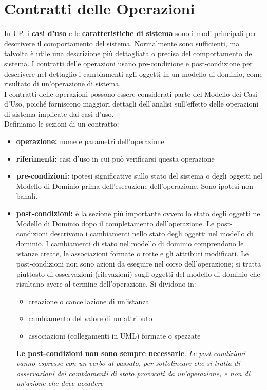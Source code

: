 \documentclass[a4paper,12pt, oneside]{book}
\begin{document}
\chapter{Contratti delle Operazioni}
In UP, i \textbf{casi d'uso} e le \textbf{caratteristiche di sistema} sono i modi principali per descrivere il comportamento del sistema. Normalmente sono sufficienti, ma talvolta è utile una descrizione più dettagliata o precisa del comportamento del sistema. I contratti delle operazioni usano pre-condizione e post-condizione per descrivere nel dettaglio i cambiamenti agli oggetti in un modello di dominio, come risultato di un'operazione di sistema.\\
I contratti delle operazioni possono essere considerati parte del Modello dei Casi d'Uso, poiché forniscono maggiori dettagli dell'analisi sull'effetto delle operazioni di sistema implicate dai casi d'uso.\\
Definiamo le sezioni di un contratto:
\begin{itemize}
	\item \textbf{operazione:} nome e parametri dell'operazione
	\item \textbf{riferimenti:} casi d'uso in cui può verificarsi questa operazione
	\item \textbf{pre-condizioni: }ipotesi significative sullo stato del sistema o degli oggetti nel Modello di Dominio prima dell'esecuzione dell'operazione. Sono ipotesi non banali.
	\item \textbf{post-condizioni: }è la sezione più importante ovvero lo stato degli oggetti nel Modello di Dominio dopo il completamento dell'operazione. Le post-condizioni descrivono i cambiamenti nello stato degli oggetti nel modello di dominio. I cambiamenti di stato nel modello di dominio comprendono le istanze create, le associazioni formate o rotte e gli attributi modificati. Le post-condizioni non sono azioni da eseguire nel corso dell'operazione; si tratta piuttosto di osservazioni (rilevazioni) sugli oggetti del modello di dominio che risultano avere al termine dell'operazione. Si dividono in:
	\begin{itemize}
		\item creazione o cancellazione di un'istanza
		\item cambiamento del valore di un attributo
		\item associazioni (collegamenti in UML) formate o spezzate
	\end{itemize}
	\textbf{Le post-condizioni non sono sempre necessarie}. \textit{Le post-condizioni vanno espresse con un verbo al passato, per sottolineare che si tratta di osservazioni dei cambiamenti di stato provocati da un'operazione, e non di un'azione che deve accadere}
\end{itemize}
\end{document}
